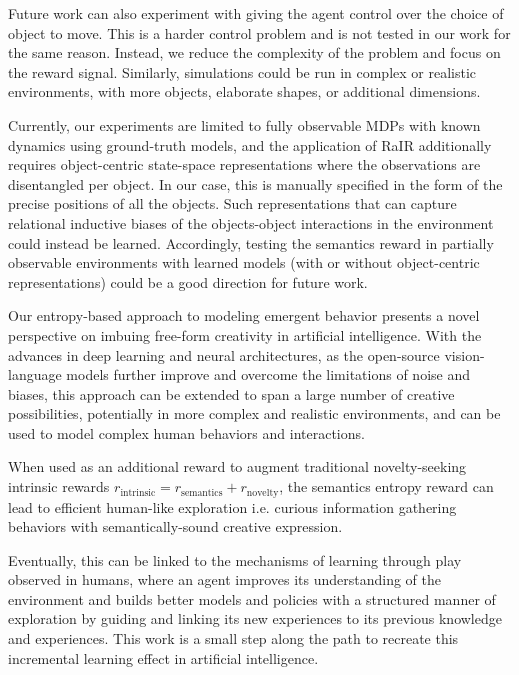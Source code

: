 Future work can also experiment with giving the agent control over the choice of object to move.
This is a harder control problem and is not tested in our work for the same reason.
Instead, we reduce the complexity of the problem and focus on the reward signal.
Similarly, simulations could be run in complex or realistic environments, with more objects, elaborate shapes, or additional dimensions.

Currently, our experiments are limited to fully observable MDPs with known dynamics using ground-truth models, and the application of RaIR additionally requires object-centric state-space representations where the observations are disentangled per object.
In our case, this is manually specified in the form of the precise positions of all the objects.
Such representations that can capture relational inductive biases of the objects-object interactions in the environment could instead be learned.
Accordingly, testing the semantics reward in partially observable environments with learned models (with or without object-centric representations) could be a good direction for future work.

Our entropy-based approach to modeling emergent behavior presents a novel perspective on imbuing free-form creativity in artificial intelligence.
With the advances in deep learning and neural architectures, as the open-source vision-language models further improve and overcome the limitations of noise and biases, this approach can be extended to span a large number of creative possibilities, potentially in more complex and realistic environments, and can be used to model complex human behaviors and interactions.

When used as an additional reward to augment traditional novelty-seeking intrinsic rewards \(r_{\text{intrinsic}} = r_{\text{semantics}} + r_{\text{novelty}}\), the semantics entropy reward can lead to efficient human-like exploration i.e. curious information gathering behaviors with semantically-sound creative expression.

Eventually, this can be linked to the mechanisms of learning through play observed in humans, where an agent improves its understanding of the environment and builds better models and policies with a structured manner of exploration by guiding and linking its new experiences to its previous knowledge and experiences.
This work is a small step along the path to recreate this incremental learning effect in artificial intelligence.
